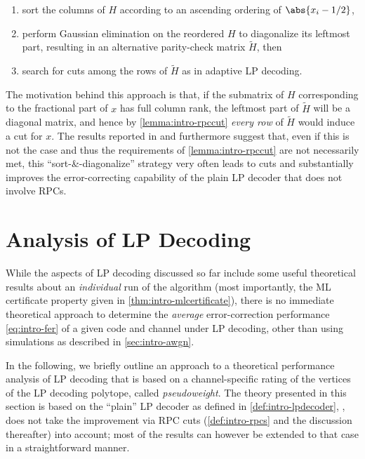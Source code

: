 \begin{enumerate}
  \item sort the columns of $H$ according to an ascending ordering of $\abs{x_i-1/2}$,
  \item perform Gaussian elimination on the reordered $H$ to diagonalize its leftmost part, resulting in an alternative parity-check matrix $\tilde H$, then
  \item search for cuts among the rows of $\tilde H$ as in adaptive LP decoding.
\end{enumerate}
The motivation behind this approach is that, if the submatrix of $H$ corresponding to the fractional part of $x$ has full column rank, the leftmost part of $\tilde H$ will be a diagonal matrix, and hence by \cref{lemma:intro-rpccut} \emph{every row} of $\tilde H$ would induce a cut for $x$. The results reported in \cite{Tanatmis+10SeparationAlgorithm} and \cite{ZhangSiegel11AdaptiveCut} furthermore suggest that, even if this is not the case and thus the requirements of \cref{lemma:intro-rpccut} are not necessarily met, this \enquote{sort-\&-diagonalize} strategy very often leads to cuts and substantially improves the error-correcting capability of the plain LP decoder that does not involve RPCs.

\section{Analysis of LP Decoding}
\label{sec:intro-lp-analysis}
While the aspects of LP decoding discussed so far include some useful theoretical results about an \emph{individual} run of the algorithm (most importantly, the ML certificate property given in \cref{thm:intro-mlcertificate}), there is no immediate theoretical approach to determine the \emph{average} error-correction performance \cref{eq:intro-fer} of a given code and channel under LP decoding, other than using simulations as described in \cref{sec:intro-awgn}.

In the following, we briefly outline an approach to a theoretical performance analysis of LP decoding that is based on a channel-specific rating of the vertices of the LP decoding polytope, called \emph{pseudoweight}. The theory presented in this section is based on the \enquote{plain} LP decoder as defined in \cref{def:intro-lpdecoder}, \ie, does not take the improvement via RPC cuts (\cref{def:intro-rpcs} and the discussion thereafter) into account; most of the results can however be extended to that case in a straightforward manner.

